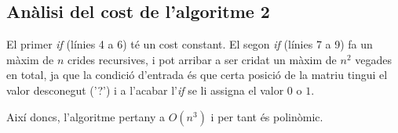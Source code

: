 \documentclass[a4paper]{article}
\begin{document}
\subsection{Anàlisi del cost de l'algoritme 2}
El primer \emph{if} (línies 4 a 6) té un cost constant. El segon \emph{if} (línies 7 a 9) fa un màxim de $n$ crides recursives, i pot arribar a ser cridat un màxim de $n^2$ vegades en total, ja que la condició d'entrada és que certa posició de la matriu tingui el valor desconegut ('?') i a l'acabar l'\emph{if} se li assigna el valor $0$ o $1$.

Així doncs, l'algoritme pertany a $O(n^3)$ i per tant és polinòmic.
\end{document}
